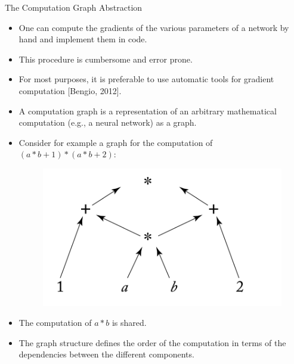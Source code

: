 \begin{frame}{The Computation Graph Abstraction}
\begin{scriptsize}
\begin{itemize}
\item  One can compute the gradients of the various parameters of a network by hand and implement them in code.

\item This procedure is cumbersome and error prone.

\item For most purposes, it is preferable to use automatic tools for gradient computation [Bengio, 2012].

\item A computation graph is a representation of an arbitrary mathematical computation (e.g., a neural network) as a graph.

\item Consider for example a graph for the computation of $(a*b+1)*(a*b+2)$:

\begin{figure}[htb]
	\centering
	 \includegraphics[scale=0.25]{pics/compGraph.png}
\end{figure}

\item The computation of $a*b$ is shared.

\item The graph structure defines the order of the computation in terms of the dependencies between the different components.

\end{itemize}
\end{scriptsize}
\end{frame}






